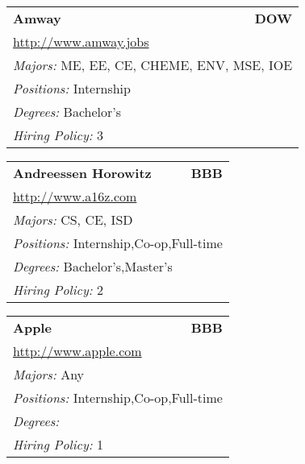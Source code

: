 \documentclass[twoside]{article}
\begin{document}
\begin{center}
\begin{multicols}{3}
\begin{FlushLeft}
\begin{minipage}{.9\columnwidth}
\end{minipage}
 
\begin{minipage}{.9\columnwidth}\begin{tabularx}{.95\columnwidth}{Xr}
                 {\Large\bf Amway} & {\Large\bf DOW}\\
    \multicolumn{2}{p{.95\columnwidth}}{\url{http://www.amway.jobs}}\\
    \multicolumn{2}{p{.95\columnwidth}}{\emph{Majors:} ME, EE, CE, CHEME, ENV, MSE, IOE}\\
    \multicolumn{2}{p{.95\columnwidth}}{\emph{Positions:} Internship}\\
    \multicolumn{2}{p{.95\columnwidth}}{\emph{Degrees:} Bachelor's}\\
    \multicolumn{2}{p{.95\columnwidth}}{\emph{Hiring Policy:} 3}\\
    \end{tabularx}
    
\end{minipage}
 
\begin{minipage}{.9\columnwidth}\begin{tabularx}{.95\columnwidth}{Xr}
                 {\Large\bf Andreessen Horowitz} & {\Large\bf BBB}\\
    \multicolumn{2}{p{.95\columnwidth}}{\url{http://www.a16z.com}}\\
    \multicolumn{2}{p{.95\columnwidth}}{\emph{Majors:} CS, CE, ISD}\\
    \multicolumn{2}{p{.95\columnwidth}}{\emph{Positions:} Internship,Co-op,Full-time}\\
    \multicolumn{2}{p{.95\columnwidth}}{\emph{Degrees:} Bachelor's,Master's}\\
    \multicolumn{2}{p{.95\columnwidth}}{\emph{Hiring Policy:} 2}\\
    \end{tabularx}
    
\end{minipage}
 
\begin{minipage}{.9\columnwidth}\begin{tabularx}{.95\columnwidth}{Xr}
                 {\Large\bf Apple} & {\Large\bf BBB}\\
    \multicolumn{2}{p{.95\columnwidth}}{\url{http://www.apple.com}}\\
    \multicolumn{2}{p{.95\columnwidth}}{\emph{Majors:} Any}\\
    \multicolumn{2}{p{.95\columnwidth}}{\emph{Positions:} Internship,Co-op,Full-time}\\
    \multicolumn{2}{p{.95\columnwidth}}{\emph{Degrees:} }\\
    \multicolumn{2}{p{.95\columnwidth}}{\emph{Hiring Policy:} 1}\\
    \end{tabularx}
    

\end{minipage}
\end{FlushLeft}
\end{multicols}
\end{center}
\end{document}
